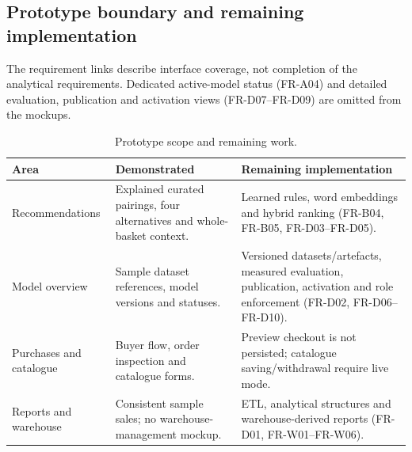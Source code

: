 \documentclass[a4paper,12pt]{article}
\newcommand{\tablestyle}{%
  \small\setstretch{1.05}%
  \renewcommand{\arraystretch}{1.25}%
  \setlength{\extrarowheight}{3pt}%
  \arrayrulecolor{tableborder}%
}
\newcommand{\req}[1]{\textsf{\small #1}}
\begin{document}
\clearpage
\subsection{Prototype boundary and remaining implementation}
\label{sec:prototype-boundary}

The requirement links describe interface coverage, not completion of the
analytical requirements. Dedicated active-model status (\req{FR-A04}) and detailed
evaluation, publication and activation views (\req{FR-D07}--\req{FR-D09}) are omitted
from the mockups.

\begin{table}[H]
  \centering
  \caption{Prototype scope and remaining work.}
  \label{tab:prototype-boundary}
  \tablestyle
  \begin{tabularx}{\textwidth}{|L{2.6cm}|>{\RaggedRight\arraybackslash}X|>{\RaggedRight\arraybackslash}X|}
    \hline
    \textbf{Area} & \textbf{Demonstrated} & \textbf{Remaining implementation} \\\hline
    Recommendations & Explained curated pairings, four alternatives and
      whole-basket context. & Learned rules, word embeddings and hybrid ranking
      (\req{FR-B04}, \req{FR-B05}, \req{FR-D03}--\req{FR-D05}). \\\hline
    Model overview & Sample dataset references, model versions and statuses.
      & Versioned datasets/artefacts, measured evaluation, publication, activation
      and role enforcement (\req{FR-D02}, \req{FR-D06}--\req{FR-D10}). \\\hline
    Purchases and catalogue & Buyer flow, order inspection and catalogue forms.
      & Preview checkout is not persisted; catalogue saving/withdrawal require
      live mode. \\\hline
    Reports and warehouse & Consistent sample sales; no warehouse-management
      mockup. & ETL, analytical structures and warehouse-derived reports
      (\req{FR-D01}, \req{FR-W01}--\req{FR-W06}). \\\hline
  \end{tabularx}
\end{table}
\end{document}
